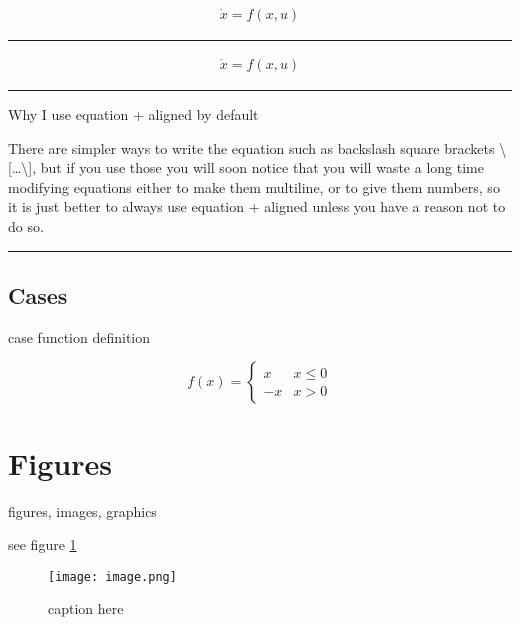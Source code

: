 \documentclass[12pt]{article}
\newcommand{\inOut}[1]{#1}                %
\begin{document}
\begin{example} \label{expFor2}
  \inOut{
    \begin{equation}\begin{aligned}\label{eqFor2}
      \dot{x} = f(x,u)
    \end{aligned}\end{equation}
  }
\end{example}\hrule

\begin{example} \label{expFor1}
  \inOut{
    \begin{equation}\begin{aligned}\label{eqFor1}
      \dot{x} = f(x,u)
    \end{aligned}\end{equation}
  }
\end{example}\hrule

\begin{remark}\label{remFor1} Why I use equation + aligned by default

  There are simpler ways to write the equation such as backslash square brackets \textbackslash{}[\ldots\textbackslash{}],
  but if you use those you will soon notice that you will waste a long time modifying equations
  either to make them multiline, or to give them numbers, so it is just better to always use
  equation + aligned unless you have a reason not to do so.
\end{remark}\hrule

\subsection{Cases}\label{cases}

case function definition

\begin{equation}
f(x) =
\begin{cases}
  x & x \le 0 \\
  -x & x>0
\end{cases}
\end{equation}

\section{Figures}\label{secTab}

figures, images, graphics

see figure \ref{fig-label}

\begin{figure}[htb]
  \centering
  \texttt{[image: image.png]}
  \caption{caption here}
  \label{fig-label}
\end{figure}
\end{document}
